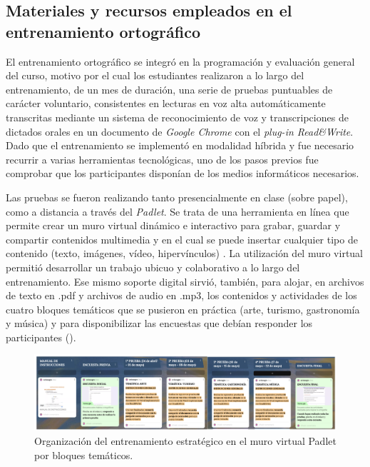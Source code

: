\documentclass[spanish]{textolivre}
\begin{document}
\subsection{Materiales y recursos empleados en el entrenamiento ortográfico}

El entrenamiento ortográfico se integró en la programación y evaluación general del curso, motivo por el cual los estudiantes realizaron a lo largo del entrenamiento, de un mes de duración, una serie de pruebas puntuables de carácter voluntario, consistentes en lecturas en voz alta automáticamente transcritas mediante un sistema de reconocimiento de voz y transcripciones de dictados orales en un documento de \textit{Google Chrome} con el \textit{plug-in Read\&Write}. Dado que el entrenamiento se implementó en modalidad híbrida y fue necesario recurrir a varias herramientas tecnológicas, uno de los pasos previos fue comprobar que los participantes disponían de los medios informáticos necesarios.

Las pruebas se fueron realizando tanto presencialmente en clase (sobre papel), como a distancia a través del \textit{Padlet}. Se trata de una herramienta en línea que permite crear un muro virtual dinámico e interactivo para grabar, guardar y compartir contenidos multimedia y en el cual se puede insertar cualquier tipo de contenido (texto, imágenes, vídeo, hipervínculos) \cite{conceicao_as_2022}. La utilización del muro virtual permitió desarrollar un trabajo ubicuo y colaborativo a lo largo del entrenamiento. Ese mismo soporte digital sirvió, también, para alojar, en archivos de texto en .pdf y archivos de audio en .mp3, los contenidos y actividades de los cuatro bloques temáticos que se pusieron en práctica (arte, turismo, gastronomía y música) y para disponibilizar las encuestas que debían responder los participantes ().

\begin{figure}
    \centering
    \begin{minipage}{.85\textwidth}
    \includegraphics[width=\linewidth]{Fig1.png}
    \caption{Organización del entrenamiento estratégico en el muro virtual Padlet por bloques temáticos.}\label{fig1}
    \end{minipage}
\end{figure}
\end{document}
